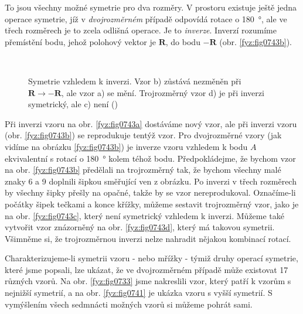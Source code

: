     To jsou všechny možné symetrie pro dva rozměry. V prostoru existuje ještě jedna operace 
    symetrie, jíž v \emph{dvojrozměrném} případě odpovídá rotace o \qty{180}{\degree}, ale ve třech 
    rozměrech je to zcela odlišná operace. Je to \emph{inverze}. Inverzí rozumíme přemístění bodu, 
    jehož polohový vektor je \(\bm{R}\), do bodu \(\bm{-R}\) (obr. \ref{fyz:fig0743b}). 

    \begin{figure}[ht!]   %
      \centering
                    \\
      \caption{Symetrie vzhledem k inverzi. Vzor b) zůstává nezměněn při \(\bm{R} \rightarrow 
               \bm{-R}\), ale vzor a) se mění. Trojrozměrný vzor d) je při inverzi symetrický, ale 
               c) není
               (\cite[s.~551]{Feynman02})}
      \label{fyz:fig0743}
    \end{figure}

    Při inverzi vzoru na obr. \ref{fyz:fig0743a} dostáváme nový vzor, ale při inverzi vzoru (obr. 
    \ref{fyz:fig0743b}) se reprodukuje tentýž vzor. Pro dvojrozměrné vzory (jak vidíme na obrázku 
    \ref{fyz:fig0743b}) je inverze vzoru vzhledem k bodu \(A\) ekvivalentní s rotací o 
    \qty{180}{\degree} kolem téhož bodu. Předpokládejme, že bychom vzor na obr. \ref{fyz:fig0743b} 
    předělali na trojrozměrný tak, že bychom všechny malé znaky \num{6} a \num{9} doplnili šipkou 
    směřující ven z obrázku. Po inverzi v třech rozměrech by všechny šipky přešly na opačné, takže 
    by se vzor nereprodukoval. Označíme-li počátky šipek tečkami a konce křížky, můžeme sestavit 
    trojrozměrný vzor, jako je na obr. \ref{fyz:fig0743c}, který není symetrický vzhledem k inverzi. 
    Můžeme také vytvořit vzor znázorněný na obr. \ref{fyz:fig0743d}, který má takovou symetrii. 
    Všimněme si, že trojrozměrnou inverzi nelze nahradit nějakou kombinací rotací.

    Charakterizujeme-li symetrii vzoru - nebo mřížky - týmiž druhy operací symetrie, které jsme 
    popsali, lze ukázat, že ve dvojrozměrném případě může existovat \num{17} různých vzorů. Na obr. 
    \ref{fyz:fig0733} jsme nakreslili vzor, který patří k vzorům s nejnižší symetrií, a na obr. 
    \ref{fyz:fig0741} je ukázka vzoru s vyšší symetrií. S vymýšlením všech sedmnácti možných vzorů 
    si můžeme pohrát sami.
    
